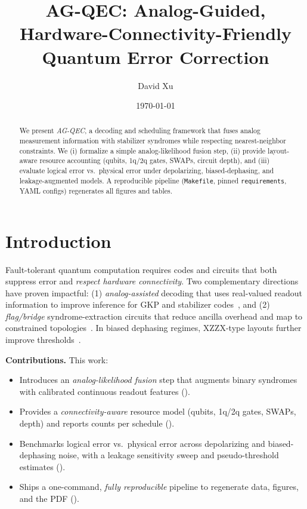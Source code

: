 \documentclass[11pt]{article}
\title{\textbf{AG-QEC: Analog-Guided, Hardware-Connectivity-Friendly Quantum Error Correction}}
\author[1]{\normalsize David Xu}
\affil[1]{\small General Algorithmic Technologies Company}
\date{\small \today}
\begin{document}
\maketitle

\begin{abstract}
We present \emph{AG-QEC}, a decoding and scheduling framework that fuses analog measurement information with stabilizer syndromes while respecting nearest-neighbor constraints. We (i) formalize a simple analog-likelihood fusion step, (ii) provide layout-aware resource accounting (qubits, 1q/2q gates, SWAPs, circuit depth), and (iii) evaluate logical error vs.\ physical error under depolarizing, biased-dephasing, and leakage-augmented models. A reproducible pipeline (\texttt{Makefile}, pinned \texttt{requirements}, YAML configs) regenerates all figures and tables.
\end{abstract}

\section{Introduction}
Fault-tolerant quantum computation requires codes and circuits that both suppress error and \emph{respect hardware connectivity}. Two complementary directions have proven impactful: (1) \emph{analog-assisted} decoding that uses real-valued readout information to improve inference for GKP and stabilizer codes~\cite{FukuiPRL2017,FukuiMBQC2017}, and (2) \emph{flag/bridge} syndrome-extraction circuits that reduce ancilla overhead and map to constrained topologies~\cite{ChamberlandBeverland2018,LaoAlmudever2020}. In biased dephasing regimes, XZZX-type layouts further improve thresholds~\cite{XZZXNatComms2021}.

\textbf{Contributions.} This work:
\begin{itemize}
  \item Introduces an \emph{analog-likelihood fusion} step that augments binary syndromes with calibrated continuous readout features ().
  \item Provides a \emph{connectivity-aware} resource model (qubits, 1q/2q gates, SWAPs, depth) and reports counts per schedule ().
  \item Benchmarks logical error vs.\ physical error across depolarizing and biased-dephasing noise, with a leakage sensitivity sweep and pseudo-threshold estimates ().
  \item Ships a one-command, \emph{fully reproducible} pipeline to regenerate data, figures, and the PDF ().
\end{itemize}
\end{document}

